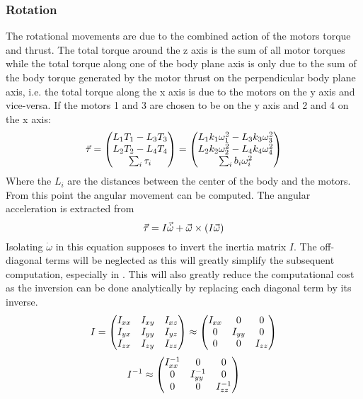 \subsubsection{Rotation} 
The rotational movements are due to the combined action of the motors torque and thrust. The total torque around the z
axis is the sum of all motor torques while the total torque along one of the body plane axis is only due to
the sum of the body torque generated by the motor thrust on the perpendicular body plane axis, i.e. the
total torque along the x axis is due to the motors on the y axis and vice-versa. If the motors 1 and 3 are chosen to be
on the y axis and 2 and 4 on the x axis:
\begin{equation}\labeleq{bodyTau}
	\v{\tau} = \matrix{
	L_1T_1-L_3T_3\\
	L_2T_2-L_4T_4\\
	\sum_{i}{\tau_i}
	} = \matrix{
	L_1k_1\omega_1^2 - L_3k_3\omega_3^2\\
	L_2k_2\omega_2^2 - L_4k_4\omega_4^2\\
	\sum_{i}{b_i \omega_i^2}
	}
\end{equation}
Where the $L_i$ are the distances between the center of the body and the motors.
From this point the angular movement can be computed. The angular acceleration is extracted from
\begin{equation}\labeleq{torqueEquation}
	\v{\tau} = I\v{\dot{\omega}} + \v{\omega}\times(I\v{\omega})
\end{equation}
Isolating $\dot{\omega}$ in this equation supposes to invert the inertia matrix $I$. The off-diagonal terms will be
neglected as this will greatly simplify the subsequent computation, especially in . This will also
greatly reduce the computational cost as the inversion can be done analytically by replacing each diagonal term by its
inverse.
\begin{equation}
	I = \begin{pmatrix}
	I_{xx} & I_{xy} & I_{xz}\\
	I_{yx} & I_{yy} & I_{yz}\\
	I_{zx} & I_{zy} & I_{zz}\\ 
	\end{pmatrix} \approx \begin{pmatrix}
	I_{xx} 	& 0 		& 0\\
	0 		& I_{yy} 	& 0\\
	0 		& 0 		& I_{zz}\\ 	
	\end{pmatrix}
\end{equation}
\begin{equation}
	I^{-1} \approx \begin{pmatrix}
	I_{xx}^{-1} & 0 			& 0\\
	0 			& I_{yy}^{-1} 	& 0\\
	0 			& 0 			& I_{zz}^{-1}\\ 		
	\end{pmatrix}
\end{equation}

